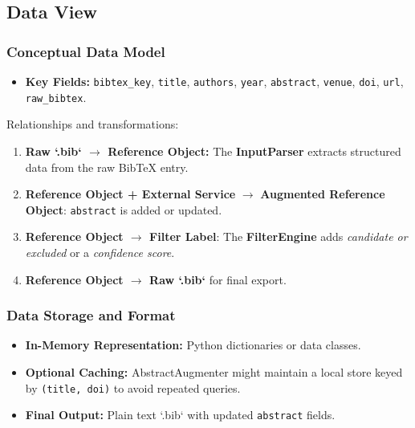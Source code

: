 \documentclass[12pt]{article}
\begin{document}
\subsection{Data View}
\label{sec:data-view}

\subsubsection{Conceptual Data Model}
\begin{description}[style=nextline]
  \item[Reference Record:] 
  \begin{itemize}
    \item \textbf{Key Fields:} \texttt{bibtex\_key}, \texttt{title}, \texttt{authors}, \texttt{year}, \texttt{abstract}, \texttt{venue}, \texttt{doi}, \texttt{url}, \texttt{raw\_bibtex}.
  \end{itemize}
\end{description}

Relationships and transformations:
\begin{enumerate}
  \item \textbf{Raw `.bib` \(\to\) Reference Object:} The \textbf{InputParser} extracts structured data from the raw BibTeX entry. 
  \item \textbf{Reference Object + External Service} \(\to\) \textbf{Augmented Reference Object}: \texttt{abstract} is added or updated. 
  \item \textbf{Reference Object \(\to\) Filter Label}: The \textbf{FilterEngine} adds \emph{candidate or excluded} or a \emph{confidence score}. 
  \item \textbf{Reference Object \(\to\) Raw `.bib`} for final export.
\end{enumerate}

\subsubsection{Data Storage and Format}
\begin{itemize}
  \item \textbf{In-Memory Representation:} Python dictionaries or data classes. 
  \item \textbf{Optional Caching:} AbstractAugmenter might maintain a local store keyed by \texttt{(title, doi)} to avoid repeated queries. 
  \item \textbf{Final Output:} Plain text `.bib` with updated \texttt{abstract} fields.
\end{itemize}
\end{document}
